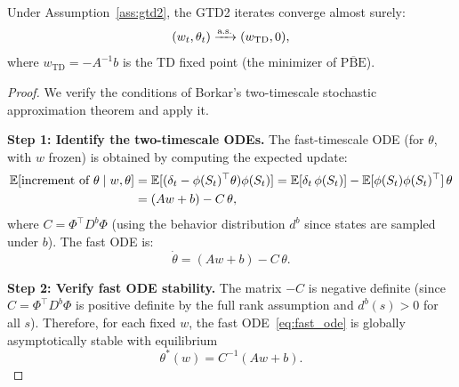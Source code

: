 \documentclass[11pt,a4paper]{article}
\begin{document}
\begin{keyresult}[title={Convergence of GTD2}]
\begin{theorem}
\label{thm:gtd2}
Under Assumption~\ref{ass:gtd2}, the GTD2 iterates converge almost
surely:
\begin{equation}
  (w_t, \theta_t) \xrightarrow{\text{a.s.}} (w_{\mathrm{TD}}, 0),
  \label{eq:gtd2_convergence}
\end{equation}
where $w_{\mathrm{TD}} = -A^{-1}b$ is the TD fixed point (the
minimizer of $\overline{\mathrm{PBE}}$).
\end{theorem}
\end{keyresult}

\begin{proof}
We verify the conditions of Borkar's two-timescale stochastic
approximation theorem \citep{borkar2008} and apply it.

\textbf{Step 1: Identify the two-timescale ODEs.}
The fast-timescale ODE (for $\theta$, with $w$ frozen) is obtained
by computing the expected update:
\begin{align}
  \mathbb{E}[\text{increment of } \theta \mid w, \theta]
  &= \mathbb{E}[(\delta_t - \phi(S_t)^\top\theta)\phi(S_t)]
  = \mathbb{E}[\delta_t\,\phi(S_t)] - \mathbb{E}[\phi(S_t)\phi(S_t)^\top]\,\theta
  \nonumber\\
  &= (Aw + b) - C\,\theta,
  \label{eq:fast_ode_rhs}
\end{align}
where $C = \Phi^\top D^b \Phi$ (using the behavior distribution
$d^b$ since states are sampled under $b$). The fast ODE is:
\begin{equation}
  \dot{\theta} = (Aw + b) - C\,\theta.
  \label{eq:fast_ode}
\end{equation}

\textbf{Step 2: Verify fast ODE stability.}
The matrix $-C$ is negative definite (since $C = \Phi^\top D^b \Phi$
is positive definite by the full rank assumption and $d^b(s) > 0$
for all $s$). Therefore, for each fixed $w$, the fast
ODE~\eqref{eq:fast_ode} is globally asymptotically stable with
equilibrium
\begin{equation}
  \theta^*(w) = C^{-1}(Aw + b).
  \label{eq:theta_star}
\end{equation}


\end{proof}
\end{document}
